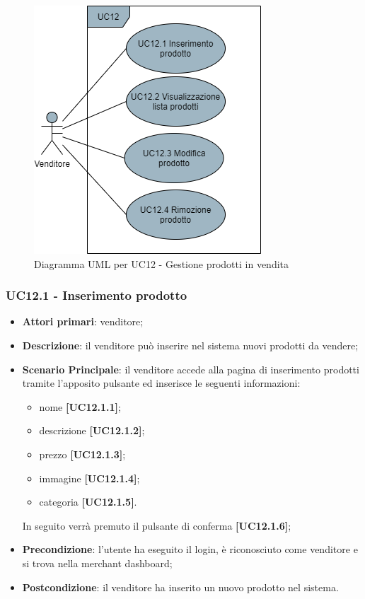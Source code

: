 \begin{figure}[H]
\centering
\includegraphics[scale=0.6]{res/UseCase/Immagini/GestioneProdotti}
\caption{Diagramma UML per UC12 - Gestione prodotti in vendita}
\end{figure}

\subsubsection{UC12.1 - Inserimento prodotto}
\begin{itemize}
\item \textbf{Attori primari}: venditore;
\item \textbf{Descrizione}: il venditore può inserire nel sistema nuovi prodotti da vendere;
\item \textbf{Scenario Principale}: il venditore accede alla pagina di inserimento prodotti tramite l'apposito pulsante ed inserisce le seguenti informazioni:
\begin{itemize}
	\item nome \textbf{[UC12.1.1]};
	\item descrizione \textbf{[UC12.1.2]};
	\item prezzo \textbf{[UC12.1.3]};
	\item immagine \textbf{[UC12.1.4]};
	\item categoria \textbf{[UC12.1.5]}.
\end{itemize}
In seguito verrà premuto il pulsante di conferma \textbf{[UC12.1.6]};
\item \textbf{Precondizione}: l'utente ha eseguito il login, è riconosciuto come venditore e si trova nella merchant dashboard;
\item \textbf{Postcondizione}: il venditore ha inserito un nuovo prodotto nel sistema.
\end{itemize}


